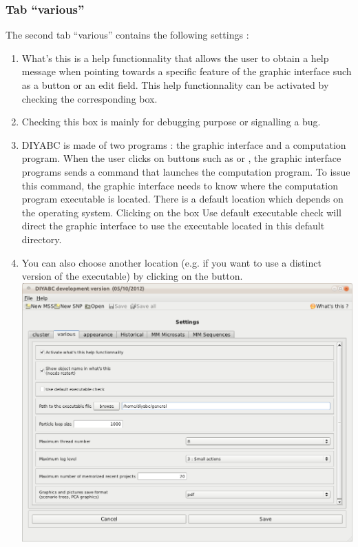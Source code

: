\subsubsection{Tab \textsf{``various''}}
The second tab \textsf{``various''} contains the following settings :

\begin{enumerate}
 \item \textsf{What's this} is a help functionnality that allows the user to obtain a help message when pointing towards a specific feature of the graphic interface such as a button or an edit field. This help functionnality can be activated by checking the corresponding box.
 \item Checking this box is mainly for debugging purpose or signalling a bug. 
 \item DIYABC is made of two programs : the graphic interface and a computation program. When the user clicks on buttons such as   or , the graphic interface programs sends a command that launches the computation program. To issue this command, the graphic interface needs to know where the computation program executable is located. There is a default location which depends on the operating system. Clicking on the box \textsf{Use default executable check} will direct the graphic interface to use the executable located in this default directory.
 \item You can also choose another location (e.g. if you want to use a distinct version of the executable) by clicking on the  button.\\
\includegraphics[scale=0.33]{gui_pictures/Capture-DIYABC-94.png} \\

\end{enumerate}
